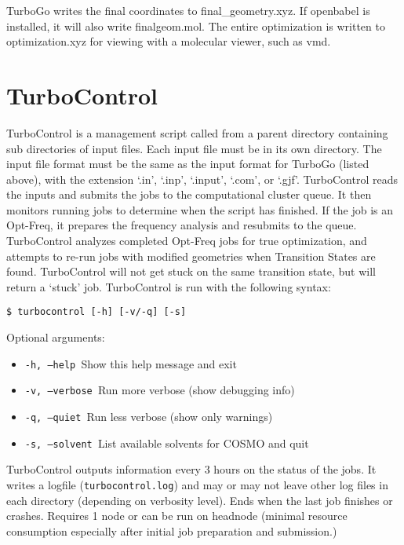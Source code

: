 TurboGo writes the final coordinates to final\_geometry.xyz. If
openbabel is installed, it will also write finalgeom.mol. The entire
optimization is written to optimization.xyz for viewing with a molecular
viewer, such as vmd.

\section{TurboControl}

TurboControl is a management script called from a parent directory
containing sub directories of input files. Each input file must be in
its own directory. The input file format must be the same as the input
format for TurboGo (listed above), with the extension `.in', `.inp',
`.input', `.com', or `.gjf'. TurboControl reads the inputs and submits
the jobs to the computational cluster queue. It then monitors running
jobs to determine when the script has finished. If the job is an
Opt-Freq, it prepares the frequency analysis and resubmits to the queue.
TurboControl analyzes completed Opt-Freq jobs for true optimization, and
attempts to re-run jobs with modified geometries when Transition States
are found. TurboControl will not get stuck on the same transition state,
but will return a `stuck' job. TurboControl is run with the following
syntax:

\begin{center}
\begin{verbatim}
$ turbocontrol [-h] [-v/-q] [-s]
\end{verbatim}
\end{center}

Optional arguments:

\begin{itemize}
\item \texttt{-h, --help            }Show this help message and exit
\item \texttt{-v, --verbose         }Run more verbose (show debugging info)
\item \texttt{-q, --quiet           }Run less verbose (show only warnings)
\item \texttt{-s, --solvent         }List available solvents for COSMO and quit
\end{itemize}

TurboControl outputs information every 3 hours on the status of the
jobs. It writes a logfile (\texttt{turbocontrol.log}) and may or may not leave
other log files in each directory (depending on verbosity level). Ends
when the last job finishes or crashes. Requires 1 node or can be run on
headnode (minimal resource consumption especially after initial job
preparation and submission.)

